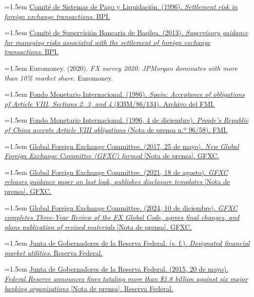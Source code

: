 \documentclass[10pt,a4paper]{article}
\begin{document}
\noindent\hangindent=1.5em \href{https://www.bis.org/cpmi/publ/d17.htm}{Comité de Sistemas de Pago y Liquidación. (1996). \textit{Settlement risk in foreign exchange transactions}. BPI.}

\noindent\hangindent=1.5em \href{https://www.bis.org/publ/bcbs241.htm}{Comité de Supervisión Bancaria de Basilea. (2013). \textit{Supervisory guidance for managing risks associated with the settlement of foreign exchange transactions}. BPI.}

\noindent\hangindent=1.5em Euromoney. (2020). \textit{FX survey 2020: JPMorgan dominates with more than 10\% market share}. Euromoney.

\noindent\hangindent=1.5em \href{https://archivescatalog.imf.org/Details/archive/125079666}{Fondo Monetario Internacional. (1986). \textit{Spain: Acceptance of obligations of Article VIII, Sections 2, 3, and 4} (EBM/86/134). Archivo del FMI.}

\noindent\hangindent=1.5em \href{https://www.imf.org/en/News/Articles/2015/09/14/01/49/pr9658}{Fondo Monetario Internacional. (1996, 4 de diciembre). \textit{People's Republic of China accepts Article VIII obligations} (Nota de prensa n.º 96/58). FMI.}

\noindent\hangindent=1.5em \href{https://www.globalfxc.org/press-releases/press-p170525b/}{Global Foreign Exchange Committee. (2017, 25 de mayo). \textit{New Global Foreign Exchange Committee (GFXC) formed} [Nota de prensa]. GFXC.}

\noindent\hangindent=1.5em \href{https://www.globalfxc.org/press/p210818.htm}{Global Foreign Exchange Committee. (2021, 18 de agosto). \textit{GFXC releases guidance paper on last look, publishes disclosure templates} [Nota de prensa]. GFXC.}

\noindent\hangindent=1.5em \href{https://www.globalfxc.org/press-releases/press-p241210/}{Global Foreign Exchange Committee. (2024, 10 de diciembre). \textit{GFXC completes Three-Year Review of the FX Global Code, agrees final changes, and plans publication of revised materials} [Nota de prensa]. GFXC.}

\noindent\hangindent=1.5em \href{https://www.federalreserve.gov/paymentsystems/designated_fmu_about.htm}{Junta de Gobernadores de la Reserva Federal. (s. f.). \textit{Designated financial market utilities}. Reserva Federal.}

\noindent\hangindent=1.5em \href{https://www.federalreserve.gov/newsevents/press/enforcement/20150520a.htm}{Junta de Gobernadores de la Reserva Federal. (2015, 20 de mayo). \textit{Federal Reserve announces fines totaling more than \$1.8 billion against six major banking organizations} [Nota de prensa]. Reserva Federal.}
\end{document}
